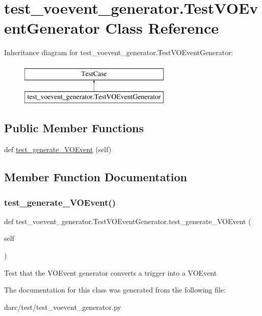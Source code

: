 \hypertarget{classtest__voevent__generator_1_1_test_v_o_event_generator}{}\section{test\+\_\+voevent\+\_\+generator.\+Test\+V\+O\+Event\+Generator Class Reference}
\label{classtest__voevent__generator_1_1_test_v_o_event_generator}
Inheritance diagram for test\+\_\+voevent\+\_\+generator.\+Test\+V\+O\+Event\+Generator\+:\begin{figure}[H]
\begin{center}
\leavevmode
\includegraphics[height=2.000000cm]{classtest__voevent__generator_1_1_test_v_o_event_generator}
\end{center}
\end{figure}
\subsection*{Public Member Functions}
\begin{DoxyCompactItemize}
\item 
def \mbox{\hyperlink{classtest__voevent__generator_1_1_test_v_o_event_generator_ad372a3906c847ad7577f9b2c57adb691}{test\+\_\+generate\+\_\+\+V\+O\+Event}} (self)
\end{DoxyCompactItemize}


\subsection{Member Function Documentation}
\mbox{\label{classtest__voevent__generator_1_1_test_v_o_event_generator_ad372a3906c847ad7577f9b2c57adb691}} 
\subsubsection{\texorpdfstring{test\_generate\_VOEvent()}{test\_generate\_VOEvent()}}
{\footnotesize\ttfamily def test\+\_\+voevent\+\_\+generator.\+Test\+V\+O\+Event\+Generator.\+test\+\_\+generate\+\_\+\+V\+O\+Event (\begin{DoxyParamCaption}\item[{}]{self }\end{DoxyParamCaption})}

\begin{DoxyVerb}Test that the VOEvent generator converts a trigger into a VOEvent
\end{DoxyVerb}
 

The documentation for this class was generated from the following file\+:\begin{DoxyCompactItemize}
\item 
darc/test/test\+\_\+voevent\+\_\+generator.\+py\end{DoxyCompactItemize}
